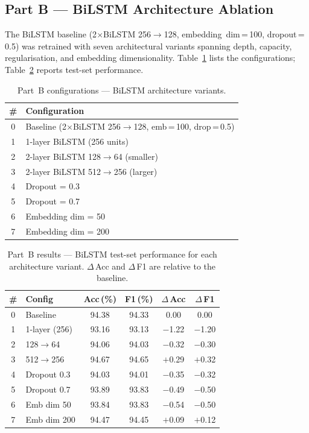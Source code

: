 \FloatBarrier
\subsection{Part B --- BiLSTM Architecture Ablation}

The BiLSTM baseline (2$\times$BiLSTM 256$\rightarrow$128, embedding~dim\,=\,100, dropout\,=\,0.5) was retrained with seven architectural variants spanning depth, capacity, regularisation, and embedding dimensionality. Table~\ref{tab:ablation_configs_b} lists the configurations; Table~\ref{tab:ablation_results_b} reports test-set performance.

\begin{table}[!htb]
\centering
\caption{Part~B configurations --- BiLSTM architecture variants.}
\label{tab:ablation_configs_b}
\footnotesize
\begin{tabular}{@{}cl@{}}
\toprule
\textbf{\#} & \textbf{Configuration} \\
\midrule
0 & Baseline (2$\times$BiLSTM 256$\rightarrow$128, emb\,=\,100, drop\,=\,0.5) \\
1 & 1-layer BiLSTM (256 units) \\
2 & 2-layer BiLSTM 128$\rightarrow$64 (smaller) \\
3 & 2-layer BiLSTM 512$\rightarrow$256 (larger) \\
4 & Dropout = 0.3 \\
5 & Dropout = 0.7 \\
6 & Embedding dim = 50 \\
7 & Embedding dim = 200 \\
\bottomrule
\end{tabular}
\end{table}

\begin{table}[!htb]
\centering
\caption{Part~B results --- BiLSTM test-set performance for each architecture variant. $\Delta$\,Acc and $\Delta$\,F1 are relative to the baseline.}
\label{tab:ablation_results_b}
\footnotesize
\setlength{\tabcolsep}{3pt}
\begin{tabular}{@{}clcccc@{}}
\toprule
\textbf{\#} & \textbf{Config} & \textbf{Acc\,(\%)} & \textbf{F1\,(\%)} & \textbf{$\Delta$\,Acc} & \textbf{$\Delta$\,F1} \\
\midrule
0 & Baseline            & 94.38 & 94.33 & 0.00   & 0.00   \\
1 & 1-layer (256)       & 93.16 & 93.13 & $-$1.22 & $-$1.20 \\
2 & 128$\rightarrow$64  & 94.06 & 94.03 & $-$0.32 & $-$0.30 \\
3 & 512$\rightarrow$256 & 94.67 & 94.65 & $+$0.29 & $+$0.32 \\
4 & Dropout 0.3         & 94.03 & 94.01 & $-$0.35 & $-$0.32 \\
5 & Dropout 0.7         & 93.89 & 93.83 & $-$0.49 & $-$0.50 \\
6 & Emb dim 50          & 93.84 & 93.83 & $-$0.54 & $-$0.50 \\
7 & Emb dim 200         & 94.47 & 94.45 & $+$0.09 & $+$0.12 \\
\bottomrule
\end{tabular}
\end{table}

